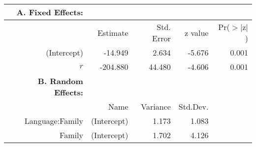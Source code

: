 \begin{tabular}{rrrrr}
 {\bf A. Fixed Effects:} \\
\hline
 & Estimate & Std. Error & z value & Pr($>$$|$z$|$) \\ 
  \hline
(Intercept) & -14.949 & 2.634 & -5.676 & 0.001 \\ 
  $r$ & -204.880 & 44.480 & -4.606 & 0.001 \\ 

\hline \hline
{\bf B. Random Effects:} \\
\hline
& Name & Variance & Std.Dev. \\
\hline
Language:Family & (Intercept) & 1.173 & 1.083 \\
Family & (Intercept) & 1.702 & 4.126 \\
\end{tabular}
